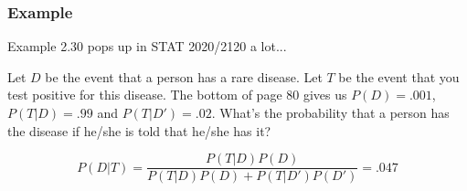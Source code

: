 \documentclass{beamer}
\begin{document}

\begin{frame}
\frametitle{Example}

Example 2.30 pops up in STAT 2020/2120 a lot...
\newline

Let $D$ be the event that a person has a rare disease. Let $T$ be the event that you test positive for this disease. The bottom of page 80 gives us $P(D) = .001$, $P(T|D) = .99$ and $P(T|D') = .02$. What's the probability that a person has the disease if he/she is told that he/she has it?
\pause 
\newline

\[
P(D|T) = \frac{P(T|D)P(D)}{P(T|D)P(D) + P(T|D')P(D')} = .047
\]

\end{frame}

\end{document}
